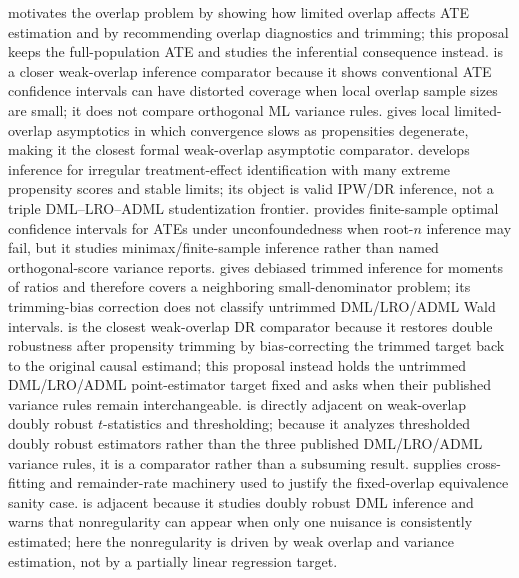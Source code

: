 \documentclass[11pt]{article}
\theoremstyle{definition}
\theoremstyle{plain}
\theoremstyle{remark}
\begin{document}
\citet{CrumpHotzImbensMitnik2009} motivates the overlap problem by showing how limited overlap affects ATE estimation and by recommending overlap diagnostics and trimming; this proposal keeps the full-population ATE and studies the inferential consequence instead.  \citet{Rothe2017LimitedOverlapCI} is a closer weak-overlap inference comparator because it shows conventional ATE confidence intervals can have distorted coverage when local overlap sample sizes are small; it does not compare orthogonal ML variance rules.  \citet{HongLeungLi2020} gives local limited-overlap asymptotics in which convergence slows as propensities degenerate, making it the closest formal weak-overlap asymptotic comparator.  \citet{HeilerKazak2021ExtremePS} develops inference for irregular treatment-effect identification with many extreme propensity scores and stable limits; its object is valid IPW/DR inference, not a triple DML--LRO--ADML studentization frontier.  \citet{ArmstrongKolesar2021FiniteSampleATE} provides finite-sample optimal confidence intervals for ATEs under unconfoundedness when root-\(n\) inference may fail, but it studies minimax/finite-sample inference rather than named orthogonal-score variance reports.  \citet{SasakiUra2022MomentsRatios} gives debiased trimmed inference for moments of ratios and therefore covers a neighboring small-denominator problem; its trimming-bias correction does not classify untrimmed DML/LRO/ADML Wald intervals.  \citet{MaSantAnnaSasakiUra2026WeakOverlapDR} is the closest weak-overlap DR comparator because it restores double robustness after propensity trimming by bias-correcting the trimmed target back to the original causal estimand; this proposal instead holds the untrimmed DML/LRO/ADML point-estimator target fixed and asks when their published variance rules remain interchangeable.  \citet{Dorn2025WeakOverlapDR} is directly adjacent on weak-overlap doubly robust \(t\)-statistics and thresholding; because it analyzes thresholded doubly robust estimators rather than the three published DML/LRO/ADML variance rules, it is a comparator rather than a subsuming result.  \citet{NeweyRobins2018} supplies cross-fitting and remainder-rate machinery used to justify the fixed-overlap equivalence sanity case.  \citet{DukesVansteelandtWhitney2024DRDML} is adjacent because it studies doubly robust DML inference and warns that nonregularity can appear when only one nuisance is consistently estimated; here the nonregularity is driven by weak overlap and variance estimation, not by a partially linear regression target.
\end{document}
